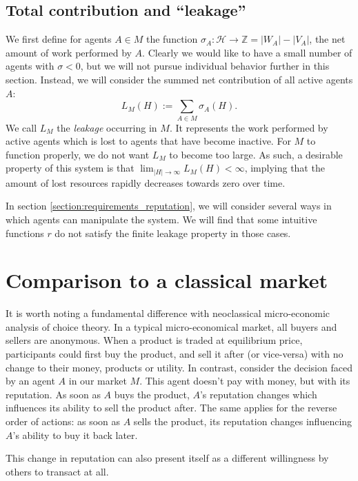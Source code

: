 \subsection{Total contribution and ``leakage''}
We first define for agents $A \in M$ the function $\sigma_A: \mathcal{H} \to \mathds{Z} = |W_A| - |V_A|$, the net amount of work performed by $A$. 
Clearly we would like to have a small number of agents with $\sigma < 0$, 
but we will not pursue individual behavior further in this section. 
Instead, we will consider the summed net contribution of all active agents $A$:
\[L_M(H) := \sum_{A \in M} \sigma_A(H).\]
We call $L_M$ the \emph{leakage} occurring in $M$. 
It represents the work performed by active agents which is lost to agents that have become inactive. 
For $M$ to function properly, 
we do not want $L_M$ to become too large. 
As such, a desirable property of this system is that $\lim_{|H| \to \infty} L_M(H) < \infty$, 
implying that the amount of lost resources rapidly decreases towards zero over time. 

In section \ref{section:requirements_reputation}, we will consider several ways in which agents can manipulate the system. 
We will find that some intuitive functions $r$ do not satisfy the finite leakage property in those cases.

\section{Comparison to a classical market}
It is worth noting a fundamental difference with neoclassical micro-economic analysis of choice theory. 
In a typical micro-economical market, 
all buyers and sellers are anonymous. 
When a product is traded at equilibrium price, 
participants could first buy the product, 
and sell it after (or vice-versa) with no change to their money, products or utility. 
In contrast, consider the decision faced by an agent $A$ in our market $M$. 
This agent doesn't pay with money, 
but with its reputation. 
As soon as $A$ buys the product, 
$A$'s reputation changes which influences its ability to sell the product after. 
The same applies for the reverse order of actions: 
as soon as $A$ sells the product, 
its reputation changes influencing $A$'s ability to buy it back later.

This change in reputation can also present itself as a different willingness by others to transact at all.
